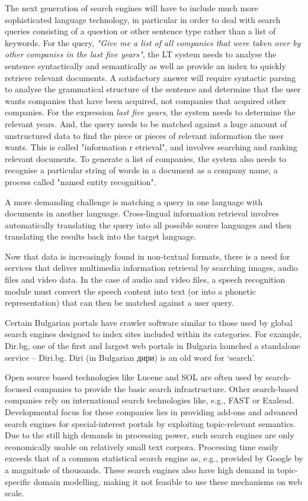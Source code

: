 \begin{multicols}{2}
The next generation of search engines will have to include much more sophisticated language technology, in particular in order to deal with search queries consisting of a question or other sentence type rather than a list of keywords. For the query, \textit{"Give me a list of all companies that were taken over by other companies in the last five years"}, the LT system needs to analyse the sentence syntactically and semantically as well as provide an index to quickly retrieve relevant documents. A satisfactory answer will require syntactic parsing to analyse the grammatical structure of the sentence and determine that the user wants companies that have been acquired, not companies that acquired other companies. For the expression \textit{last five years}, the system needs to determine the relevant years. And, the query needs to be matched against a huge amount of unstructured data to find the piece or pieces of relevant information the user wants. This is called "information r
 etrieval", and involves searching and ranking relevant documents. To generate a list of companies, the system also needs to recognise a particular string of words in a document as a company name, a process called "named entity recognition".

A more demanding challenge is matching a query in one language with documents in another language. Cross-lingual information retrieval involves automatically translating the query into all possible source languages and then translating the results back into the target language. 

Now that data is increasingly found in non-textual formats, there is a need for services that deliver multimedia information retrieval by searching images, audio files and video data. In the case of audio and video files, a speech recognition module must convert the speech content into text (or into a phonetic representation) that can then be matched against a user query.

Certain Bulgarian portals have crawler software similar to those used by global search engines designed to index sites included within its categories. For example, Dir.bg, one of the first and largest web portals in Bulgaria launched a standalone service – Diri.bg. Diri (in Bulgarian {дири}) is an old word for ‘search’. 


Open source based technologies like Lucene and SOL are often used by search-focused companies to provide the basic search infrastructure. Other search-based companies rely on international search technologies like, e.g., FAST or Exalead. Developmental focus for these companies lies in providing add-ons and advanced search engines for special-interest portals by exploiting topic-relevant semantics. Due to the still high demands in processing power, such search engines are only economically usable on relatively small text corpora. Processing time easily exceeds that of a common statistical search engine as, e.g., provided by Google by a magnitude of thousands. These search engines also have high demand in topic-specific domain modelling, making it not feasible to use these mechanisms on web scale.



\end{multicols}
